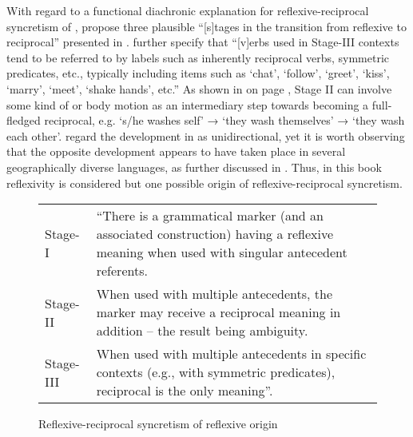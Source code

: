 With regard to a functional diachronic explanation for reflexive-reciprocal syncretism of , \cite[194]{heine:miyashita:2008} propose three plausible “[s]tages in the transition from reflexive to reciprocal” presented in . \cite[194]{heine:miyashita:2008} further specify that “[v]erbs used in Stage-III contexts tend to be referred to by labels such as inherently reciprocal verbs, symmetric predicates, etc., typically including items such as ‘chat’, ‘follow’, ‘greet’, ‘kiss’, ‘marry’, ‘meet’, ‘shake hands’, etc.” As shown in  on page \pageref{fig:ch7:unidirectional}, Stage II can involve some kind of  or body motion as an intermediary step towards becoming a full-fledged reciprocal, e.g. ‘s/he washes self’ → ‘they wash themselves’ → ‘they wash each other’. \cite[194]{heine:miyashita:2008} regard the development in  as unidirectional, yet it is worth observing that the opposite development appears to have taken place in several geographically diverse languages, as further discussed in . Thus, in this book reflexivity is considered but one possible origin of reflexive-reciprocal syncretism.

\begin{figure}
	\caption{Reflexive-reciprocal syncretism of reflexive origin}
	\label{fig:ch7:refl-recp}
	\begin{tabularx}{.90\textwidth}{lX}
		Stage-I & “There is a grammatical marker (and an associated construction) having a reflexive meaning when used with singular antecedent referents. \\
		Stage-II & When used with multiple antecedents, the marker may receive a reciprocal meaning in addition – the result being ambiguity. \\
		Stage-III & When used with multiple antecedents in specific contexts (e.g., with symmetric predicates), reciprocal is the only meaning”. \hfill \citep[194]{heine:miyashita:2008}
	\end{tabularx}
\end{figure}


